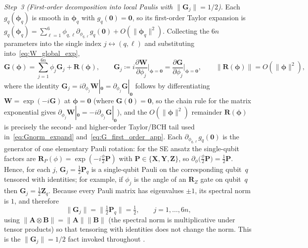 \documentclass[11pt]{article}
\theoremstyle{plain}
\theoremstyle{plain}
\begin{document}
\emph{Step~3 (First-order decomposition into local Paulis with
$\|\mathbf{G}_j\|=1/2$).}
Each $g_q(\bm\phi_q)$ is smooth in $\bm\phi_q$ with $g_q(\bm0)=\mathbf{0}$, so
its first-order Taylor expansion is
$g_q(\bm\phi_q)=\sum_{\ell=1}^{6}\phi_{q,\ell} 
\partial_{\phi_{q,\ell}}g_q(\bm0)+O(\|\bm\phi_q\|^2)$.  Collecting the
$6n$ parameters into the single index
$j\leftrightarrow(q,\ell)$ and substituting
into~\eqref{eq:W_global_exp},
\begin{equation}\label{eq:G_first_order_app}
  \mathbf{G}(\bm\phi)=\sum_{j=1}^{6n}\phi_j \mathbf{G}_j+\mathbf{R}(\bm\phi),
  \qquad
  \mathbf{G}_j\coloneqq i \frac{\partial\mathbf{W}}{\partial\phi_j}\Big|_{\bm\phi=\bm0}
        =\frac{\partial\mathbf{G}}{\partial\phi_j}\Big|_{\bm\phi=\bm0},
  \qquad \|\mathbf{R}(\bm\phi)\|=O(\|\bm\phi\|^2),
\end{equation}
where the identity
$\mathbf{G}_j=i \partial_{\phi_j}\mathbf{W}|_{\bm0}=\partial_{\phi_j}\mathbf{G}|_{\bm0}$
follows by differentiating $\mathbf{W}=\exp(-i\mathbf{G})$ at $\bm\phi=\bm0$ (where
$\mathbf{G}(\bm0)=\mathbf{0}$, so the chain rule for the matrix exponential gives
$\partial_{\phi_j}\mathbf{W}|_{\bm0}=-i \partial_{\phi_j}\mathbf{G}|_{\bm0}$), and the
$O(\|\bm\phi\|^2)$ remainder $\mathbf{R}(\bm\phi)$ is precisely the
second- and higher-order Taylor/BCH tail used
in~\eqref{eq:Gnorm_expand} and~\eqref{eq:G_first_order_app}.  Each
$\partial_{\phi_{q,\ell}}g_q(\bm0)$ is the generator of one elementary
Pauli rotation: for the SE ansatz the single-qubit factors are
$\mathbf{R}_P(\phi)=\exp(-i\tfrac{\phi}{2}\mathbf{P})$ with
$\mathbf{P}\in\{\mathbf{X},\mathbf{Y},\mathbf{Z}\}$, so
$\partial_\phi\bigl(\tfrac{\phi}{2}\mathbf{P}\bigr)=\tfrac12\mathbf{P}$.  Hence, for
each $j$, $\mathbf{G}_j=\tfrac12\mathbf{P}_q$ is a single-qubit Pauli on the
corresponding qubit~$q$ tensored with identities; for example, if
$\phi_j$ is the angle of an $\mathbf{R}_Z$ gate on qubit~$q$ then
$\mathbf{G}_j=\tfrac12\mathbf{Z}_q$.  Because every Pauli matrix has eigenvalues
$\pm1$, its spectral norm is $1$, and therefore
\begin{equation}\label{eq:Gj_norm_half}
  \|\mathbf{G}_j\|=\bigl\|\tfrac12\mathbf{P}_q\bigr\|=\tfrac12 ,
  \qquad j=1,\dots,6n,
\end{equation}
using $\|\mathbf{A}\otimes\mathbf{B}\|=\|\mathbf{A}\| \|\mathbf{B}\|$ (the spectral norm is
multiplicative under tensor products) so that tensoring with identities
does not change the norm.  This is the $\|\mathbf{G}_j\|=1/2$ fact invoked
throughout .
\end{document}
